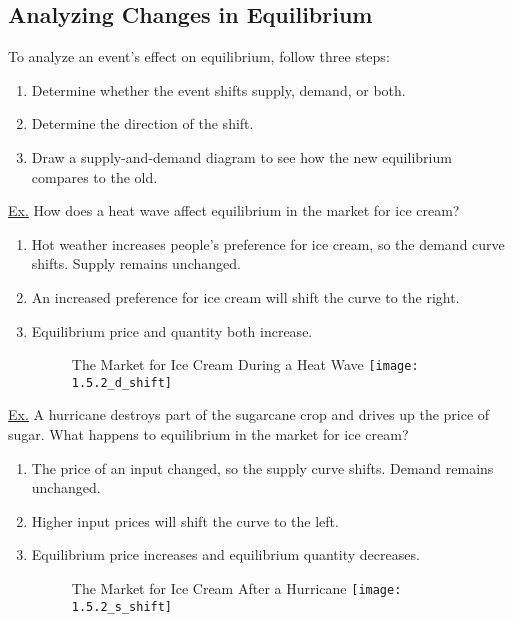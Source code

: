 \subsection{Analyzing Changes in Equilibrium}

	To analyze an event's effect on equilibrium, follow three steps:
	
	\begin{enumerate}
	
	\item Determine whether the event shifts supply, demand, or both.
	
	\item Determine the direction of the shift.
	
	\item Draw a supply-and-demand diagram to see how the new equilibrium compares to the old. 
	
	\end{enumerate}
	
	\noindent \underline{Ex.} How does a heat wave affect equilibrium in the market for ice cream?
	
	\begin{enumerate}
	
	\item Hot weather increases people's preference for ice cream, so the demand curve shifts. Supply remains unchanged.
	
	\item An increased preference for ice cream will shift the curve to the right. 
	
	\item Equilibrium price and quantity both increase. 
	
	\begin{figure}[h]
	The Market for Ice Cream During a Heat Wave
	\centering
	\texttt{[image: 1.5.2\_d\_shift]}
	\end{figure}
	
	\end{enumerate}
	
	\newpage
	
	\noindent \underline{Ex.} A hurricane destroys part of the sugarcane crop and drives up the price of sugar. What happens to equilibrium in the market for ice cream?
	
	\begin{enumerate}
	
	\item The price of an input changed, so the supply curve shifts. Demand remains unchanged.
	
	\item Higher input prices will shift the curve to the left. 
	
	\item Equilibrium price increases and equilibrium quantity decreases. 
	
	\begin{figure}[h]
	The Market for Ice Cream After a Hurricane
	\centering
	\texttt{[image: 1.5.2\_s\_shift]}
	\end{figure}
	
	\end{enumerate}
	

